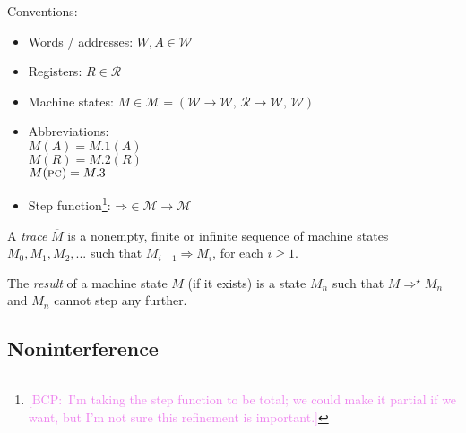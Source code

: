 \documentclass[conference]{IEEEtran}
\newif\ifdraft \drafttrue
\newcommand{\bcp}[1]{\ifdraft\textcolor{violet}{{[BCP:~#1]}}\fi}
\newcommand{\word}{W}
\newcommand{\addr}{A}
\newcommand{\WORDS}{{\mathcal W}}
\newcommand{\reg}{R}
\newcommand{\REGS}{{\mathcal R}}
\newcommand{\mach}{M}
\newcommand{\MACHS}{{\mathcal M}}
\newcommand{\trace}[1]{\overline{#1}}
\newcommand{\stepsto}{\Rightarrow}
\newcommand{\manystepsto}{\stepsto^\star}
\begin{document}
Conventions:
%
\begin{itemize}
\item Words / addresses: $\word,\addr \in \WORDS$
\item Registers: $\reg \in \REGS$
\item Machine states:
$\mach \in \MACHS = (\WORDS\rightarrow\WORDS,\, \REGS\rightarrow\WORDS,\,
\WORDS)$
\item Abbreviations:
\\ $\mach(\addr) = \mach.1(\addr)$
\\ $\mach(\reg) = \mach.2(\reg)$
\\ $\mach(\textsc{pc}) = \mach.3$
\item Step function\footnote{\bcp{I'm taking the step function to be total;
    we could make it partial if we want, but I'm not sure this refinement is
    important.}}: $\mathord{\stepsto} \in \MACHS \rightarrow \MACHS$
\end{itemize}

A {\em trace} $\trace{M}$ is a nonempty, finite or infinite
sequence of machine states $\mach_0, \mach_1, \mach_2, ...$ such that
$\mach_{i-1} \stepsto \mach_i$, for each $i \geq 1$.



The {\em result} of a machine state $\mach$ (if it exists) is a state
$\mach_n$ such that $\mach \manystepsto \mach_n$ and $\mach_n$ cannot step
any further.

\subsection{Noninterference}
\end{document}
